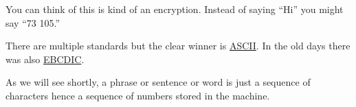 \begin{fullwidth}

You can think of this is kind of an encryption. Instead of saying ``Hi'' you might say ``73 105.''
 
There are multiple standards but the clear winner is \href{http://www.asciitable.com/}{ASCII}. In the old days there was also \href{http://www.lookuptables.com/ebcdic_scancodes.php}{EBCDIC}.

As we will see shortly, a phrase or sentence or word is just a sequence of characters hence a sequence of numbers stored in the machine.


\end{fullwidth}
